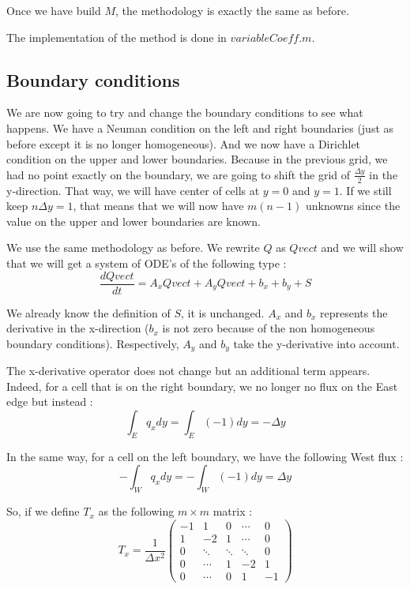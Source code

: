 Once we have build $M$, the methodology is exactly the same as before.

The implementation of the method is done in $variableCoeff.m$.



\subsection{Boundary conditions}
We are now going to try and change the boundary conditions to see what happens. We have a Neuman condition on the left and right boundaries (just as before except it is no longer homogeneous). And we now have a Dirichlet condition on the upper and lower boundaries. Because in the previous grid, we had no point exactly on the boundary, we are going to shift the grid of $\frac{\Delta y}{2}$ in the y-direction. That way, we will have center of cells at $y=0$ and $y=1$. If we still keep $n\Delta y =1$, that means that we will now have $m(n-1)$ unknowns since the value on the upper and lower boundaries are known.

We use the same methodology as before. We rewrite $Q$ as $Qvect$ and we will show that we will get a system of ODE's of the following type : 
$$\frac{dQvect}{dt} = A_xQvect+A_yQvect+b_x+b_y+S$$

We already know the definition of $S$, it is unchanged. $A_x$ and $b_x$ represents the derivative in the x-direction ($b_x$ is not zero because of the non homogeneous boundary conditions). Respectively, $A_y$ and $b_y$ take the y-derivative into account.

The x-derivative operator does not change but an additional term appears. Indeed, for a cell that is on the right boundary, we no longer no flux on the East edge but instead : 
$$\int_E q_xdy = \int_E (-1)dy = -\Delta y$$ 

In the same way, for a cell on the left boundary, we have the following West flux :
$$-\int_Wq_xdy=-\int_W(-1)dy = \Delta y$$

So, if we define $T_x$ as the following $m\times m$ matrix :
$$T_x = \frac{1}{\Delta x^2}\left(\begin{array}{ccccc}
-1 & 1 & 0 & \cdots & 0 \\ 
1 & -2 & 1 & \cdots & 0 \\ 
0& \ddots & \ddots & \ddots & 0 \\ 
0 & \cdots & 1 & -2 & 1 \\
0 & \cdots & 0 & 1 & -1
\end{array}\right) $$

